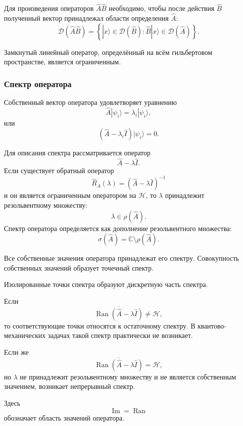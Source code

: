 \documentclass[12pt,a4paper]{article}
\begin{document}
Для произведения операторов $\hat A\hat B$ необходимо, чтобы после
действия $\hat B$ полученный вектор принадлежал области определения
$\hat A$:
\[
    \mathcal D(\hat A\hat B)
    =
    \left\{
        |x\rangle\in\mathcal D(\hat B):
        \hat B|x\rangle\in\mathcal D(\hat A)
    \right\}.
\]

Замкнутый линейный оператор, определённый на всём гильбертовом
пространстве, является ограниченным.


\subsubsection{Спектр оператора}

Собственный вектор оператора удовлетворяет уравнению
\[
    \boxed{
        \hat A|\psi_i\rangle
        =
        \lambda_i|\psi_i\rangle
    },
\]
или
\[
    \boxed{
        (\hat A-\lambda_i\hat I)
        |\psi_i\rangle
        =
        0
    }.
\]

Для описания спектра рассматривается оператор
\[
    \hat A-\lambda\hat I.
\]
Если существует обратный оператор
\[
    \boxed{
        \hat R_A(\lambda)
        =
        (\hat A-\lambda\hat I)^{-1}
    }
\]
и он является ограниченным оператором на $\mathcal H$, то
$\lambda$ принадлежит резольвентному множеству:
\[
    \lambda\in\rho(\hat A).
\]
Спектр оператора определяется как дополнение резольвентного множества:
\[
    \boxed{
        \sigma(\hat A)
        =
        \mathbb C\setminus\rho(\hat A)
    }.
\]

Все собственные значения оператора принадлежат его спектру.
Совокупность собственных значений образует точечный спектр.

Изолированные точки спектра образуют дискретную часть спектра.

Если
\[
    \overline{
        \operatorname{Ran}
        (\hat A-\lambda\hat I)
    }
    \neq
    \mathcal H,
\]
то соответствующие точки относятся к остаточному спектру. В
квантово-механических задачах такой спектр практически не возникает.

Если же
\[
    \boxed{
    \overline{
        \operatorname{Ran}
        (\hat A-\lambda\hat I)
    }
    =
    \mathcal H
    },
\]
но $\lambda$ не принадлежит резольвентному множеству и не является
собственным значением, возникает непрерывный спектр.

Здесь
\[
    \operatorname{Im}
    =
    \operatorname{Ran}
\]
обозначает область значений оператора.
\end{document}
